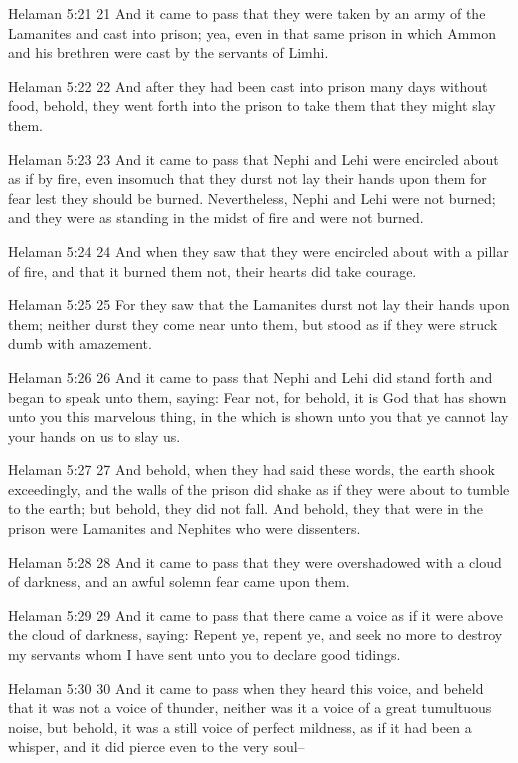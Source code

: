 Helaman 5:21
 21 And it came to pass that they were taken by an army of the
Lamanites and cast into prison; yea, even in that same prison in
which Ammon and his brethren were cast by the servants of Limhi.

Helaman 5:22
 22 And after they had been cast into prison many days without
food, behold, they went forth into the prison to take them that
they might slay them.

Helaman 5:23
 23 And it came to pass that Nephi and Lehi were encircled about
as if by fire, even insomuch that they durst not lay their hands
upon them for fear lest they should be burned. Nevertheless,
Nephi and Lehi were not burned; and they were as standing in the
midst of fire and were not burned.

Helaman 5:24
 24 And when they saw that they were encircled about with a
pillar of fire, and that it burned them not, their hearts did
take courage.

Helaman 5:25
 25 For they saw that the Lamanites durst not lay their hands
upon them; neither durst they come near unto them, but stood as
if they were struck dumb with amazement.

Helaman 5:26
 26 And it came to pass that Nephi and Lehi did stand forth and
began to speak unto them, saying: Fear not, for behold, it is God
that has shown unto you this marvelous thing, in the which is
shown unto you that ye cannot lay your hands on us to slay us.

Helaman 5:27
 27 And behold, when they had said these words, the earth shook
exceedingly, and the walls of the prison did shake as if they
were about to tumble to the earth; but behold, they did not fall.
And behold, they that were in the prison were Lamanites and
Nephites who were dissenters.

Helaman 5:28
 28 And it came to pass that they were overshadowed with a cloud
of darkness, and an awful solemn fear came upon them.

Helaman 5:29
 29 And it came to pass that there came a voice as if it were
above the cloud of darkness, saying: Repent ye, repent ye, and
seek no more to destroy my servants whom I have sent unto you to
declare good tidings.

Helaman 5:30
 30 And it came to pass when they heard this voice, and beheld
that it was not a voice of thunder, neither was it a voice of a
great tumultuous noise, but behold, it was a still voice of
perfect mildness, as if it had been a whisper, and it did pierce
even to the very soul--

